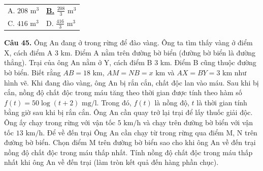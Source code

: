 \documentclass[12pt,a4paper]{article}
\makeatletter
\newcommand{\choiceB}[4]{

    \par\vspace{0.5em}\noindent

    \begin{tabularx}{\textwidth}{@{}X X@{}}

    A. #1 & \underline{\textbf{B.}} #2 \\[1.2em]

    C. #3 & D. #4

    \end{tabularx}

}
\makeatother
\begin{document}

\choiceB{$208\text{ m}^3$}{$\frac{208}{3}\text{ m}^3$}{$416\text{ m}^3$}{$\frac{416}{3}\text{ m}^3$}



\textbf{Câu 45.} Ông An đang ở trong rừng để đào vàng. Ông ta tìm thấy vàng ở điểm X, cách điểm A 3 km. Điểm A nằm trên đường bờ biển (đường bờ biển là đường thẳng). Trại của ông An nằm ở Y, cách điểm B 3 km. Điểm B cũng thuộc đường bờ biển. Biết rằng $AB=18\text{ km}$, $AM=NB=x\text{ km}$ và $AX=BY=3\text{ km}$ như hình vẽ. Khi đang đào vàng, ông An bị rắn cắn, chất độc lan vào máu. Sau khi bị cắn, nồng độ chất độc trong máu tăng theo thời gian được tính theo hàm số $f(t)=50\log(t+2)\text{ mg/l}$. Trong đó, $f(t)$ là nồng độ, $t$ là thời gian tính bằng giờ sau khi bị rắn cắn. Ông An cần quay trở lại trại để lấy thuốc giải độc. Ông ấy chạy trong rừng với vận tốc $5\text{ km/h}$ và chạy trên đường bờ biển với vận tốc $13\text{ km/h}$. Để về đến trại Ông An cần chạy từ trong rừng qua điểm M, N trên đường bờ biển. Chọn điểm M trên đường bờ biển sao cho khi ông An về đến trại nồng độ chất độc trong máu thấp nhất. Tính nồng độ chất độc trong máu thấp nhất khi ông An về đến trại (làm tròn kết quả đến hàng phần chục).
\end{document}

